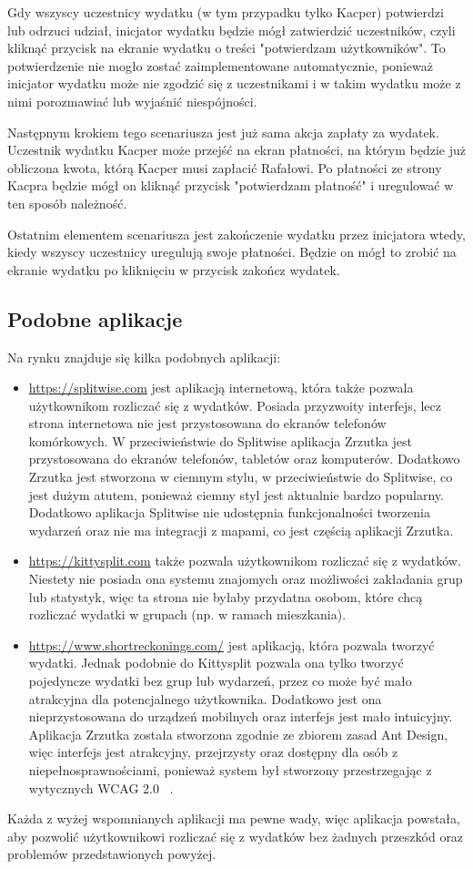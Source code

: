 Gdy wszyscy uczestnicy wydatku (w tym przypadku tylko Kacper) potwierdzi lub odrzuci udział, inicjator wydatku będzie mógł zatwierdzić uczestników, czyli kliknąć przycisk na ekranie wydatku o treści "potwierdzam użytkowników". To potwierdzenie nie mogło zostać zaimplementowane automatycznie, ponieważ inicjator wydatku może nie zgodzić się z uczestnikami i w takim wydatku może z nimi porozmawiać lub wyjaśnić niespójności.

Następnym krokiem tego scenariusza jest już sama akcja zapłaty za wydatek. Uczestnik wydatku Kacper może przejść na ekran płatności, na którym będzie już obliczona kwota, którą Kacper musi zapłacić Rafałowi. Po płatności ze strony Kacpra będzie mógł on kliknąć przycisk "potwierdzam płatność" i uregulować w ten sposób należność.

Ostatnim elementem scenariusza jest zakończenie wydatku przez inicjatora wtedy, kiedy wszyscy uczestnicy uregulują swoje płatności. Będzie on mógł to zrobić na ekranie wydatku po kliknięciu w przycisk zakończ wydatek.

\subsection{Podobne aplikacje}
Na rynku znajduje się kilka podobnych aplikacji:
\begin{itemize}
  \item \url{https://splitwise.com} jest aplikacją internetową, która także pozwala użytkownikom rozliczać się z wydatków. Posiada przyzwoity interfejs, lecz strona internetowa nie jest przystosowana do ekranów telefonów komórkowych. W przeciwieństwie do Splitwise aplikacja Zrzutka jest przystosowana do ekranów telefonów, tabletów oraz komputerów. Dodatkowo Zrzutka jest stworzona w ciemnym stylu, w przeciwieństwie do Splitwise, co jest dużym atutem, ponieważ ciemny styl jest aktualnie bardzo popularny. Dodatkowo aplikacja Splitwise nie udostępnia funkcjonalności tworzenia wydarzeń oraz nie ma integracji z mapami, co jest częścią aplikacji Zrzutka.
  \item \url{https://kittysplit.com} także pozwala użytkownikom rozliczać się z wydatków. Niestety nie posiada ona systemu znajomych oraz możliwości zakładania grup lub statystyk, więc ta strona nie byłaby przydatna osobom, które chcą rozliczać wydatki w grupach (np. w ramach mieszkania).
  \item \url{https://www.shortreckonings.com/} jest aplikacją, która pozwala tworzyć wydatki. Jednak podobnie do Kittysplit pozwala ona tylko tworzyć pojedyncze wydatki bez grup lub wydarzeń, przez co może być mało atrakcyjna dla potencjalnego użytkownika. Dodatkowo jest ona nieprzystosowana do urządzeń mobilnych oraz interfejs jest mało intuicyjny. Aplikacja Zrzutka została stworzona zgodnie ze zbiorem zasad Ant Design, więc interfejs jest atrakcyjny, przejrzysty oraz dostępny dla osób z niepełnosprawnościami, ponieważ system był stworzony przestrzegając z wytycznych WCAG 2.0 ~\cite{ref_wcag}.

\end{itemize}
  Każda z wyżej wspomnianych aplikacji ma pewne wady, więc aplikacja powstała, aby pozwolić użytkownikowi rozliczać się z wydatków bez żadnych przeszkód oraz problemów przedstawionych powyżej.


